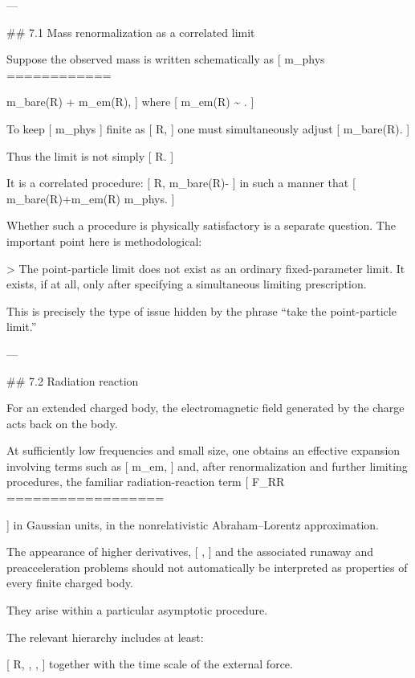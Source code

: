 ---

## 7.1 Mass renormalization as a correlated limit

Suppose the observed mass is written schematically as
[
m_{\rm phys}
============

m_{\rm bare}(R)
+
m_{\rm em}(R),
]
where
[
m_{\rm em}(R)
\sim
{}.
]

To keep
[
m_{\rm phys}
]
finite as
[
R,
]
one must simultaneously adjust
[
m_{\rm bare}(R).
]

Thus the limit is not simply
[
R.
]

It is a correlated procedure:
[
R,
\qquad
m_{\rm bare}(R)\rightarrow-\infty
]
in such a manner that
[
m_{\rm bare}(R)+m_{\rm em}(R)
\rightarrow
m_{\rm phys}.
]

Whether such a procedure is physically satisfactory is a separate question. The important point here is methodological:

> The point-particle limit does not exist as an ordinary fixed-parameter limit. It exists, if at all, only after specifying a simultaneous limiting prescription.

This is precisely the type of issue hidden by the phrase ``take the point-particle limit.''

---

## 7.2 Radiation reaction

For an extended charged body, the electromagnetic field generated by the charge acts back on the body.

At sufficiently low frequencies and small size, one obtains an effective expansion involving terms such as
[
m_{\rm em},
]
and, after renormalization and further limiting procedures, the familiar radiation-reaction term
[
\mathbf F_{\rm RR}
==================

]
in Gaussian units, in the nonrelativistic Abraham--Lorentz approximation.

The appearance of higher derivatives,
[
,
]
and the associated runaway and preacceleration problems should not automatically be interpreted as properties of every finite charged body.

They arise within a particular asymptotic procedure.

The relevant hierarchy includes at least:

[
R,
\qquad
{},
\qquad
{},
]
together with the time scale of the external force.

